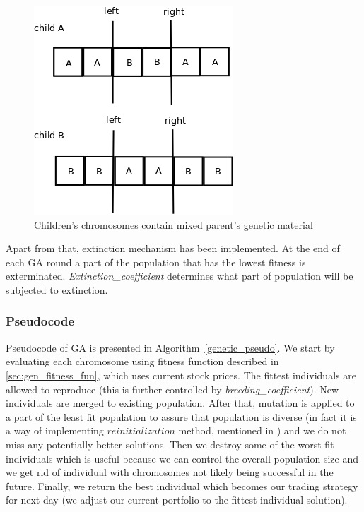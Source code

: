 \begin{description}
	  \begin{figure}[H]
	    \begin{center}
	      \includegraphics[scale=.3]{children.png}
	    \end{center}
	    \caption{Children's chromosomes contain mixed parent's genetic material}
	    \label{fig:children}
	  \end{figure}

\end{description}

Apart from that, extinction mechanism has been implemented.
At the end of each GA round a part of the population that has the lowest fitness is exterminated.
\emph{Extinction\_coefficient} determines what part of population will be subjected to extinction.
 
\subsubsection{Pseudocode}

Pseudocode of GA is presented in Algorithm~\ref{genetic_pseudo}.
We start by evaluating each chromosome using fitness function described in \ref{sec:gen_fitness_fun}, which uses current stock prices.
The fittest individuals are allowed to reproduce (this is further controlled by \emph{breeding\_coefficient}).
New individuals are merged to existing population.
After that, mutation is applied to a part of the least fit population to assure that population is diverse (in fact it is a way of implementing $reinitialization$
method, mentioned in \cite{zitz1999a}) and we do not miss any potentially better solutions.
Then we destroy some of the worst fit individuals which is useful because we can control the overall population size and we get rid of individual with chromosomes
not likely being successful in the future.
Finally, we return the best individual which becomes our trading strategy for next day (we adjust our current portfolio to the fittest individual solution). 


